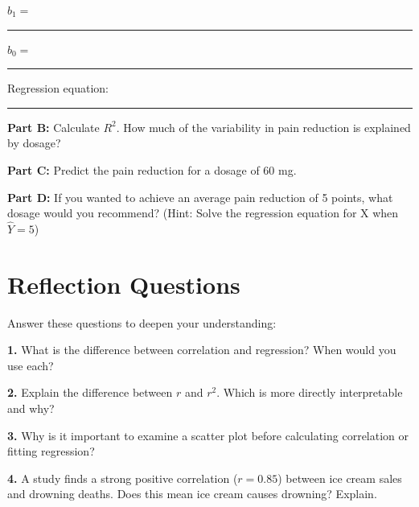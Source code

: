 \documentclass[11pt]{article}
\begin{document}
$b_1 = $ \rule{6cm}{0.4pt}

\vspace{2cm}

$b_0 = $ \rule{6cm}{0.4pt}

\vspace{2cm}

Regression equation: \rule{8cm}{0.4pt}

\vspace{1cm}

\textbf{Part B:} Calculate $R^2$. How much of the variability in pain reduction is explained by dosage?

\vspace{3cm}

\textbf{Part C:} Predict the pain reduction for a dosage of 60 mg.

\vspace{3cm}

\textbf{Part D:} If you wanted to achieve an average pain reduction of 5 points, what dosage would you recommend? (Hint: Solve the regression equation for X when $\hat{Y} = 5$)

\vspace{4cm}

\newpage

\section*{Reflection Questions}

Answer these questions to deepen your understanding:

\vspace{0.5cm}

\textbf{1.} What is the difference between correlation and regression? When would you use each?

\vspace{3cm}

\textbf{2.} Explain the difference between $r$ and $r^2$. Which is more directly interpretable and why?

\vspace{3cm}

\textbf{3.} Why is it important to examine a scatter plot before calculating correlation or fitting regression?

\vspace{3cm}

\textbf{4.} A study finds a strong positive correlation ($r = 0.85$) between ice cream sales and drowning deaths. Does this mean ice cream causes drowning? Explain.
\end{document}
